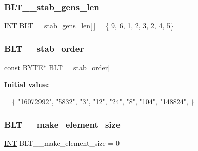 \subsubsection{\texorpdfstring{B\+L\+T\+\_\+\_\+stab\+\_\+gens\+\_\+len}{BLT\_53\_stab\_gens\_len}}
{\footnotesize\ttfamily \mbox{\hyperlink{galois_8h_a09fddde158a3a20bd2dcadb609de11dc}{I\+NT}} B\+L\+T\+\_\+\_\+stab\+\_\+gens\+\_\+len\mbox{[}$\,$\mbox{]} = \{ 9, 6, 1, 2, 3, 2, 4, 5\}}

\mbox{\label{data___b_l_t_8_c_a959fb582c5e6d1f52782368748eced8e}} 
\subsubsection{\texorpdfstring{B\+L\+T\+\_\+\_\+stab\+\_\+order}{BLT\_53\_stab\_order}}
{\footnotesize\ttfamily const \mbox{\hyperlink{galois_8h_ab6cc7b4aeb6ea31aba2b3fbfc83ff5e6}{B\+Y\+TE}}$\ast$ B\+L\+T\+\_\+\_\+stab\+\_\+order\mbox{[}$\,$\mbox{]}}

{\bfseries Initial value\+:}
\begin{DoxyCode}
= \{
\textcolor{stringliteral}{"16072992"},
\textcolor{stringliteral}{"5832"},
\textcolor{stringliteral}{"3"},
\textcolor{stringliteral}{"12"},
\textcolor{stringliteral}{"24"},
\textcolor{stringliteral}{"8"},
\textcolor{stringliteral}{"104"},
\textcolor{stringliteral}{"148824"},
\}
\end{DoxyCode}
\mbox{\label{data___b_l_t_8_c_ac82e99c7157172759b2dd112c6e5def6}} 
\subsubsection{\texorpdfstring{B\+L\+T\+\_\+\_\+make\+\_\+element\+\_\+size}{BLT\_5\_make\_element\_size}}
{\footnotesize\ttfamily \mbox{\hyperlink{galois_8h_a09fddde158a3a20bd2dcadb609de11dc}{I\+NT}} B\+L\+T\+\_\+\_\+make\+\_\+element\+\_\+size = 0}

